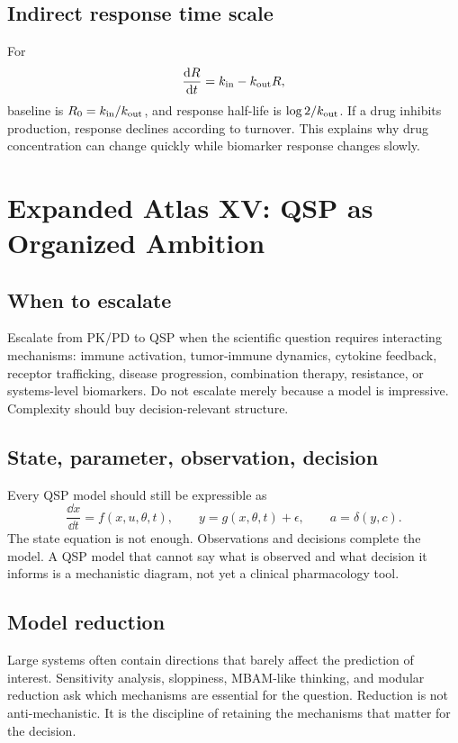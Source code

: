 \subsection{Indirect response time scale}

For
\[
  \frac{\mathop{}\!\mathrm{d} R}{\mathop{}\!\mathrm{d} t}=k_{\mathrm{in}}-k_{\mathrm{out}}R,
\]
baseline is \(R_0=k_{\mathrm{in}}/k_{\mathrm{out}}\), and response half-life is \(\log 2/k_{\mathrm{out}}\). If a drug inhibits production, response declines according to turnover. This explains why drug concentration can change quickly while biomarker response changes slowly.

\section{Expanded Atlas XV: QSP as Organized Ambition}

\subsection{When to escalate}

Escalate from PK/PD to QSP when the scientific question requires interacting mechanisms: immune activation, tumor-immune dynamics, cytokine feedback, receptor trafficking, disease progression, combination therapy, resistance, or systems-level biomarkers. Do not escalate merely because a model is impressive. Complexity should buy decision-relevant structure.

\subsection{State, parameter, observation, decision}

Every QSP model should still be expressible as
\[
  \frac{\dd x}{\dd t}=f(x,u,\theta,t),
  \qquad
  y=g(x,\theta,t)+\epsilon,
  \qquad
  a=\delta(y,c).
\]
The state equation is not enough. Observations and decisions complete the model. A QSP model that cannot say what is observed and what decision it informs is a mechanistic diagram, not yet a clinical pharmacology tool.

\subsection{Model reduction}

Large systems often contain directions that barely affect the prediction of interest. Sensitivity analysis, sloppiness, MBAM-like thinking, and modular reduction ask which mechanisms are essential for the question. Reduction is not anti-mechanistic. It is the discipline of retaining the mechanisms that matter for the decision.

